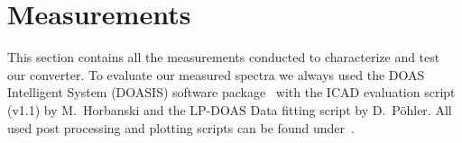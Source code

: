 \section{Measurements}
\label{sec:measurements}

This section contains all the measurements conducted to characterize
and test our converter. To evaluate our measured spectra we always
used the DOAS Intelligent System (DOASIS) software
package~\cite{doasis} with the ICAD evaluation script (v1.1) by M.\
Horbanski and the LP-DOAS Data fitting script by D.\ Pöhler. All used
post processing and plotting scripts can be found under~\cite{scripts}.

